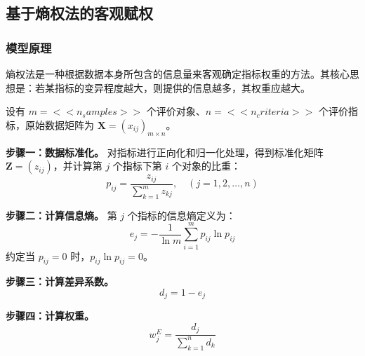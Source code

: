
\subsection{基于熵权法的客观赋权}

\subsubsection{模型原理}

熵权法是一种根据数据本身所包含的信息量来客观确定指标权重的方法。其核心思想是：若某指标的变异程度越大，则提供的信息越多，其权重应越大。

设有 $m = << n_samples >>$ 个评价对象、$n = << n_criteria >>$ 个评价指标，原始数据矩阵为 $\mathbf{X} = (x_{ij})_{m \times n}$。

\textbf{步骤一：数据标准化。} 对指标进行正向化和归一化处理，得到标准化矩阵 $\mathbf{Z} = (z_{ij})$，并计算第 $j$ 个指标下第 $i$ 个对象的比重：
\begin{equation}
    p_{ij} = \frac{z_{ij}}{\sum_{k=1}^{m} z_{kj}}, \quad (j = 1, 2, \ldots, n)
    \label{eq:entropy_proportion}
\end{equation}

\textbf{步骤二：计算信息熵。} 第 $j$ 个指标的信息熵定义为：
\begin{equation}
    e_j = -\frac{1}{\ln m} \sum_{i=1}^{m} p_{ij} \ln p_{ij}
    \label{eq:entropy_value}
\end{equation}
约定当 $p_{ij} = 0$ 时，$p_{ij} \ln p_{ij} = 0$。

\textbf{步骤三：计算差异系数。}
\begin{equation}
    d_j = 1 - e_j
    \label{eq:entropy_divergence}
\end{equation}

\textbf{步骤四：计算权重。}
\begin{equation}
    w_j^{E} = \frac{d_j}{\sum_{k=1}^{n} d_k}
    \label{eq:entropy_weight}
\end{equation}

